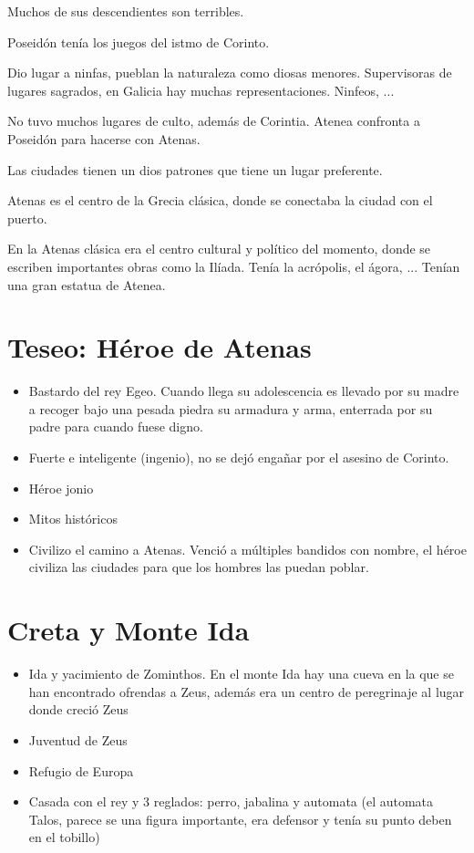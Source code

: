 Muchos de sus descendientes son terribles.

Poseidón tenía los juegos del istmo de Corinto.

Dio lugar a ninfas, pueblan la naturaleza como diosas menores. Supervisoras de lugares sagrados, en Galicia hay muchas representaciones. Ninfeos, ...

No tuvo muchos lugares de culto, además de Corintia. Atenea confronta a Poseidón para hacerse con Atenas.

Las ciudades tienen un dios patrones que tiene un lugar preferente.

Atenas es el centro de la Grecia clásica, donde se conectaba la ciudad con el puerto.

En la Atenas clásica era el centro cultural y político del momento, donde se escriben importantes obras como la Ilíada. Tenía la acrópolis, el ágora, ... Tenían una gran estatua de Atenea.

\section{Teseo: Héroe de Atenas}
\begin{itemize}
	\item Bastardo del rey Egeo. Cuando llega su adolescencia es llevado por su madre a recoger bajo una pesada piedra su armadura y arma, enterrada por su padre para cuando fuese digno.
	\item Fuerte e inteligente (ingenio), no se dejó engañar por el asesino de Corinto.
	\item Héroe jonio
	\item Mitos históricos
	\item Civilizo el camino a Atenas. Venció a múltiples bandidos con nombre, el héroe civiliza las ciudades para que los hombres las puedan poblar.
\end{itemize}

\section{Creta y Monte Ida}
\begin{itemize}
	\item Ida y yacimiento de Zominthos. En el monte Ida hay una cueva en la que se han encontrado ofrendas a Zeus, además era un centro de peregrinaje al lugar donde creció Zeus
	\item Juventud de Zeus
	\item Refugio de Europa
	\item Casada con el rey y 3 reglados: perro, jabalina y automata (el automata Talos, parece se una figura importante, era defensor y tenía su punto deben en el tobillo)
\end{itemize}

